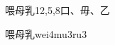\begin{entry}{喂母乳}{12,5,8}{⼝、⽏、⼄}
  \begin{phonetics}{喂母乳}{wei4mu3ru3}
  \end{phonetics}
\end{entry}
